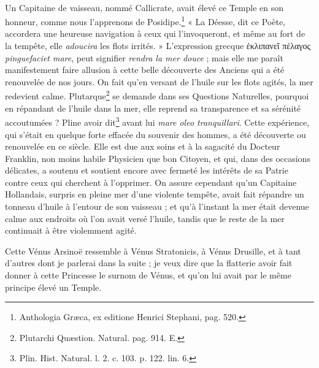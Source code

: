 \documentclass[a4paper, 18pt, oneside]{article}
\begin{document}
\paragraph{}
Un Capitaine de vaisseau, nommé Callicrate, avait élevé ce Temple en son honneur, comme nous l'apprenons de Posidipe.\footnote{Anthologia Græca, ex editione Henrici Stephani, pag. 520.} « La Déesse, dit ce Poète, accordera une heureuse navigation à ceux qui l'invoqueront, et même au fort de la tempête, elle \emph{adoucira} les flots irrités. » L'expression grecque ἐκλιπανεῖ πέλαγος \emph{pinguefaciet mare}, peut signifier \emph{rendra la mer douce} ; mais elle me paraît manifestement faire allusion à cette belle découverte des Anciens qui a été renouvelée de nos jours. On fait qu'en versant de l'huile sur les flots agités, la mer redevient calme. Plutarque\footnote{Plutarchi Quæstion. Natural. pag. 914. E.} se demande dans ses Questions Naturelles, pourquoi en répandant de l'huile dans la mer, elle reprend sa transparence et sa sérénité accoutumées ? Pline avoir dit\footnote{Plin. Hist. Natural. l. 2. c. 103. p. 122. lin. 6.} avant lui \emph{mare oleo tranquillari}. Cette expérience, qui s'était en quelque forte effacée du souvenir des hommes, a été découverte ou renouvelée en ce siècle. Elle est due aux soins et à la sagacité du Docteur Franklin, non moins habile Physicien que bon Citoyen, et qui, dans des occasions délicates, a soutenu et soutient encore avec fermeté les intérêts de sa Patrie contre ceux qui cherchent à l'opprimer. On assure cependant qu'un Capitaine Hollandais, surpris en pleine mer d'une violente tempête, avait fait répandre un tonneau d'huile à l'entour de son vaisseau ; et qu'à l'instant la mer était devenue calme aux endroits où l'on avait versé l'huile, tandis que le reste de la mer continuait à être violemment agité.

Cette Vénus Arsinoë ressemble à Vénus Stratonicis, à Vénus Drusille, et à tant d'autres dont je parlerai dans la suite ; je veux dire que la flatterie avoir fait donner à cette Princesse le surnom de Vénus, et qu'on lui avait par le même principe élevé un Temple.
\end{document}
